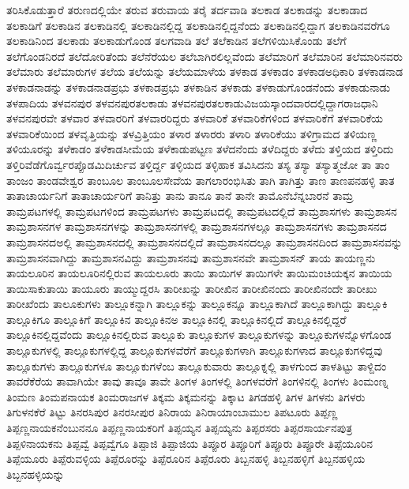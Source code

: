 {ತರಿಸಿಕೊಡುತ್ತಾರೆ
ತರುಣದಲ್ಲಿಯೇ
ತರುವ
ತರುವಾಯ
ತರೈ
ತರ್ದವಾಡಿ
ತಲಕಾಡ
ತಲಕಾಡನ್ನು
ತಲಕಾಡಾದ
ತಲಕಾಡಿಗೆ
ತಲಕಾಡಿನ
ತಲಕಾಡಿನಲ್ಲಿ
ತಲಕಾಡಿನಲ್ಲಿದ್ದ
ತಲಕಾಡಿನಲ್ಲಿದ್ದನೆಂದು
ತಲಕಾಡಿನಲ್ಲಿದ್ದಾಗ
ತಲಕಾಡಿನವರೆಗೂ
ತಲಕಾಡಿನಿಂದ
ತಲಕಾಡು
ತಲಕಾಡುಗೊಂಡ
ತಲಗವಾಡಿ
ತಲೆ
ತಲೆಕಾಡಿನ
ತಲೆಗಳಿಯಿಸಿಕೊಂಡು
ತಲೆಗೆ
ತಲೆಗೊಂಡನಿರದೆ
ತಲೆದೋರಿತೆಂದು
ತಲೆನೆರೆಯಲ
ತಲೆಬಾಗಿರಲಿಲ್ಲವೆಂದು
ತಲೆಮಾರಿಗೆ
ತಲೆಮಾರಿನ
ತಲೆಮಾರಿನವರು
ತಲೆಮಾರು
ತಲೆಮಾರುಗಳ
ತಲೆಯ
ತಲೆಯನ್ನು
ತಲೆಯಮಾಳೆಯ
ತಳಕಾಡ
ತಳಕಾಡಂ
ತಳಕಾಡಅಧಿಕಾರಿ
ತಳಕಾಡನಾಡ
ತಳಕಾಡನಾಡನ್ನು
ತಳಕಾಡನಾಡಪ್ರಭು
ತಳಕಾಡಪ್ರಭು
ತಳಕಾಡಿನ
ತಳಕಾಡು
ತಳಕಾಡುಗೊಂಡನೆಂದು
ತಳಕಾಡುನಾಡು
ತಳಪಾದಿಯ
ತಳವನಪುರ
ತಳವನಪುರತಲಕಾಡು
ತಳವನಪುರತಲಕಾಡುವಿಜಯಸ್ಕಾಂದವಾರದಲ್ಲಿದ್ದಾಗರಾಜಧಾನಿ
ತಳವನಪುರವೇ
ತಳವಾರ
ತಳವಾರರಿಗೆ
ತಳವಾರರಿದ್ದರು
ತಳವಾರಿಕೆ
ತಳವಾರಿಕೆಗಳಿಂದ
ತಳವಾರಿಕೆಗೆ
ತಳವಾರಿಕೆಯ
ತಳವಾರಿಕೆಯಿಂದ
ತಳವೃತ್ತಿಯನ್ನು
ತಳವ್ರಿತ್ತಿಯಂ
ತಳಾರ
ತಳಾರರು
ತಳಾರಿ
ತಳಾರಿಕೆಯು
ತಳಿಗ್ರಾಮದ
ತಳಿಯಣ್ಣ
ತಳಿಯೂರನ್ನು
ತಳೆಕಾಡಂ
ತಳೆಕಾಡಸೀಮೆಯ
ತಳೆಕಾಡುಪಟ್ಟಣ
ತಳೆದನೆಂದು
ತಳೆದಿದ್ದರು
ತಳೆದು
ತಳ್ತಿಯದ
ತಳ್ತಿರಿದು
ತಳ್ತಿರಿವೆಡೆಗೊರ್ವ್ವರಪ್ಪೊಡಮಿದಿರ್ಚುವ
ತಳ್ತಿರ್ದ್ದ
ತಳ್ಳಿಯದ
ತಳ್ಳಿಹಾಕ
ತವಿಸಿದನು
ತಸ್ಯ
ತಸ್ಯಾ
ತಸ್ಯಾತ್ಮಜೋ
ತಾ
ತಾಂ
ತಾಂಜಂ
ತಾಂಡವೇಶ್ವರ
ತಾಂಬೂಲ
ತಾಂಬೂಲಸೇವೆಯ
ತಾಗಲಾರಂಭಿಸಿತು
ತಾಗಿ
ತಾಗಿತ್ತು
ತಾಣ
ತಾಣಪನಹಳ್ಳಿ
ತಾತ
ತಾತಾಚಾರ್ಯನಿಗೆ
ತಾತಾಚಾರ್ಯರಿಗೆ
ತಾನಿತ್ತು
ತಾನು
ತಾನೂ
ತಾನೆ
ತಾನೇ
ತಾಮೊನೆಬೆನ್ನಬಾರನೆ
ತಾಮ್ರ
ತಾಮ್ರಪಟಗಳಲ್ಲಿ
ತಾಮ್ರಪಟಗಳಿಂದ
ತಾಮ್ರಪಟಗಳು
ತಾಮ್ರಪಟದಲ್ಲಿ
ತಾಮ್ರಪಟದಲ್ಲಿದೆ
ತಾಮ್ರಶಾಸಗಳು
ತಾಮ್ರಶಾಸನ
ತಾಮ್ರಶಾಸನಗಳ
ತಾಮ್ರಶಾಸನಗಳನ್ನು
ತಾಮ್ರಶಾಸನಗಳಲ್ಲಿ
ತಾಮ್ರಶಾಸನಗಳಲ್ಲೂ
ತಾಮ್ರಶಾಸನಗಳು
ತಾಮ್ರಶಾಸನದ
ತಾಮ್ರಶಾಸನದಅಲ್ಲಿ
ತಾಮ್ರಶಾಸನದಲ್ಲಿ
ತಾಮ್ರಶಾಸನದಲ್ಲಿದೆ
ತಾಮ್ರಶಾಸನದಲ್ಲೂ
ತಾಮ್ರಶಾಸನದಿಂದ
ತಾಮ್ರಶಾಸನವನ್ನು
ತಾಮ್ರಶಾಸನವಾಗಿದ್ದು
ತಾಮ್ರಶಾಸನವಿದ್ದು
ತಾಮ್ರಶಾಸನವು
ತಾಮ್ರಶಾಸನವೇ
ತಾಮ್ರಶಾಸನ್
ತಾಯ
ತಾಯಣ್ಣನು
ತಾಯಲೂರಿನ
ತಾಯಲೂರಿನಲ್ಲಿರುವ
ತಾಯಲೂರು
ತಾಯಿ
ತಾಯಿಗಳ
ತಾಯಿಗಳೇ
ತಾಯಿಮಂಚಿಯಕ್ಕನ
ತಾಯಿಯ
ತಾಯಿಸಾಕುತಾಯಿ
ತಾಯೂರು
ತಾಯ್ಮುದ್ದರಸಿ
ತಾರೀಖನ್ನು
ತಾರೀಖಿನ
ತಾರೀಖಿನಂದು
ತಾರೀಖಿನಂದೇ
ತಾರೀಖು
ತಾರೀಖೆಂದು
ತಾಲೂಕುಗಳು
ತಾಲ್ಲೂಕನ್ನಾಗಿ
ತಾಲ್ಲೂಕನ್ನು
ತಾಲ್ಲೂಕನ್ನೂ
ತಾಲ್ಲೂಕಾಗಿದೆ
ತಾಲ್ಲೂಕಾಗಿದ್ದು
ತಾಲ್ಲೂಕಿ
ತಾಲ್ಲೂಕಿಗೂ
ತಾಲ್ಲೂಕಿಗೆ
ತಾಲ್ಲೂಕಿನ
ತಾಲ್ಲೂಕಿನಅ
ತಾಲ್ಲೂಕಿನಲ್ಲಿ
ತಾಲ್ಲೂಕಿನಲ್ಲಿದೆ
ತಾಲ್ಲೂಕಿನಲ್ಲಿದ್ದರೆ
ತಾಲ್ಲೂಕಿನಲ್ಲಿದ್ದವೆಂದು
ತಾಲ್ಲೂಕಿನಲ್ಲಿರುವ
ತಾಲ್ಲೂಕು
ತಾಲ್ಲೂಕುಗಳ
ತಾಲ್ಲೂಕುಗಳನ್ನು
ತಾಲ್ಲೂಕುಗಳನ್ನೊಳಗೊಂಡ
ತಾಲ್ಲೂಕುಗಳಲ್ಲಿ
ತಾಲ್ಲೂಕುಗಳಲ್ಲಿದ್ದ
ತಾಲ್ಲೂಕುಗಳವೆರೆಗೆ
ತಾಲ್ಲೂಕುಗಳಾಗಿ
ತಾಲ್ಲೂಕುಗಳಾದ
ತಾಲ್ಲೂಕುಗಳಿದ್ದವು
ತಾಲ್ಲೂಕುಗಳು
ತಾಲ್ಲೂಕುಗಳೂ
ತಾಲ್ಲೂಕುಗಳೆಂಬ
ತಾಲ್ಲೂಕುವಾರು
ತಾಲ್ಲೂಕ್ನಲ್ಲಿ
ತಾಳಗುಂದ
ತಾಳತಿಟ್ಟು
ತಾಳ್ದಿದಂ
ತಾವರೆಕೆರೆಯ
ತಾವಾಗಿಯೇ
ತಾವು
ತಾವೂ
ತಾವೇ
ತಿಂಗಳ
ತಿಂಗಳಲ್ಲಿ
ತಿಂಗಳವರೆಗೆ
ತಿಂಗಳಿನಲ್ಲಿ
ತಿಂಗಳು
ತಿಂಮಂಣ್ನ
ತಿಂಮಣ
ತಿಂಮಪನಾಯಕ
ತಿಂಮರಾಜಗಳ
ತಿಕ್ಕಮ
ತಿಕ್ಕಮನನ್ನು
ತಿಕ್ಕಾಟ
ತಿಗಡಹಳ್ಳಿ
ತಿಗಳ
ತಿಗಳನು
ತಿಗಳರು
ತಿಗುಳನಕೆರೆ
ತಿಟ್ಟು
ತಿನರಸಿಪುರ
ತಿನರಸೀಪುರ
ತಿನಿರಾಯ
ತಿನಿರಾಯಾಂಬಾಮುಲ
ತಿಪಟೂರು
ತಿಪ್ಪಣ್ಣ
ತಿಪ್ಪಣ್ಣನಾಯಕನೆಂಬುನನೂ
ತಿಪ್ಪಣ್ಣನಾಯಕರಿಗೆ
ತಿಪ್ಪಯ್ಯನ
ತಿಪ್ಪಯ್ಯನು
ತಿಪ್ಪರಸರು
ತಿಪ್ಪರಸಾರ್ಯನಪುತ್ರ
ತಿಪ್ಪಳಿನಾಯಕನು
ತಿಪ್ಪವ್ವೆ
ತಿಪ್ಪವ್ವೆಗೂ
ತಿಪ್ಪಾಜಿ
ತಿಪ್ಪಾಜಿಯ
ತಿಪ್ಪೂರ
ತಿಪ್ಪೂರಿಗೆ
ತಿಪ್ಪೂರು
ತಿಪ್ಪೂರೇ
ತಿಪ್ಪೆಯೂರಿನ
ತಿಪ್ಪೆಯೂರು
ತಿಪ್ಪೆರುವಳ್ಳಿಯ
ತಿಪ್ಪೆರೂರನ್ನು
ತಿಪ್ಪೆರೂರಿನ
ತಿಪ್ಪೆರೂರು
ತಿಬ್ಬನಹಳ್ಳಿ
ತಿಬ್ಬನಹಳ್ಳಿಗೆ
ತಿಬ್ಬನಹಳ್ಳಿಯ
ತಿಬ್ಬನಹಳ್ಳಿಯನ್ನು
}
